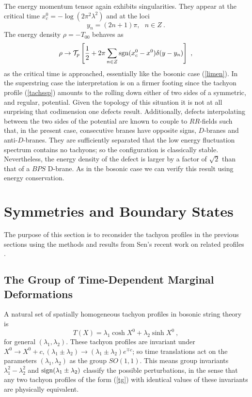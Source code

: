 \documentclass[a4paper,12pt]{article}
\begin{document}
The energy momentum tensor again exhibits singularities. They appear at the 
critical time
$x^0_c = -\log(2\pi^2\lambda^2)$ and at the loci 
\begin{equation}
y_n = (2n+1)\pi , ~~~n \in Z~. 
\end{equation}
The energy density $\rho=-T_{00}$ behaves as
\begin{equation}
\rho \to {\cal T}_p 
\left[ {1\over 2}+  2\pi\sum_{n\in Z} {\rm sgn}(x^0_c-x^0)\delta(y-y_n)\right] ~,
\end{equation}
as the critical time is approached, essentially like the bosonic case (\ref{limen}). 
In the superstring case the interpretation is on a  firmer footing 
since the tachyon profile (\ref{tachssp})
amounts to the rolling down either of two sides of a symmetric, and regular, potential.
Given the topology of this situation it is not at all surprising that codimension one
defects result. Additionally, defects interpolating between the two sides of the potential
are known to couple to $RR$-fields such that, in the present case, consecutive branes 
have opposite signs, $D$-branes and anti-$D$-branes. They are sufficiently separated
that the low energy fluctuation spectrum contains no tachyons; so the configuration
is classically stable.  Nevertheless, the energy density of the defect is larger by a factor 
of $\sqrt{2}$ than that of a $BPS$ D-brane. As in the bosonic case we can verify this
result using energy conservation. 

\section{Symmetries and  Boundary States}
\label{boundary}
The purpose of this section is to reconsider the tachyon profiles in the previous 
sections using the methods and results from Sen's recent work on related 
profiles \cite{Sen1}.

\subsection{The Group of Time-Dependent Marginal Deformations}
A natural set of spatially homogeneous tachyon profiles in bosonic string theory 
is 
\begin{equation}
T(X)= \lambda_1 \cosh X^0+\lambda_2 \sinh X^0~,
\label{tg}
\end{equation}
for general $(\lambda_1,\lambda_2)$. These tachyon profiles are invariant under 
$X^0 \rightarrow X^0 +c, 
(\lambda_1 \pm\lambda_2) \rightarrow (\lambda_1 \pm \lambda_2) e^{\mp c}$;
so time translations act on the parameters $(\lambda_1,\lambda_2)$ as the 
group $SO(1,1)$. This means group invariants $\lambda_1^2-\lambda_2^2$ and 
${\rm sign}(\lambda_1 \pm \lambda_2)$ classify the possible perturbations, in the
sense that any two 
tachyon profiles of the form (\ref{tg}) with identical values of these invariants are 
physically equivalent.
\end{document}
